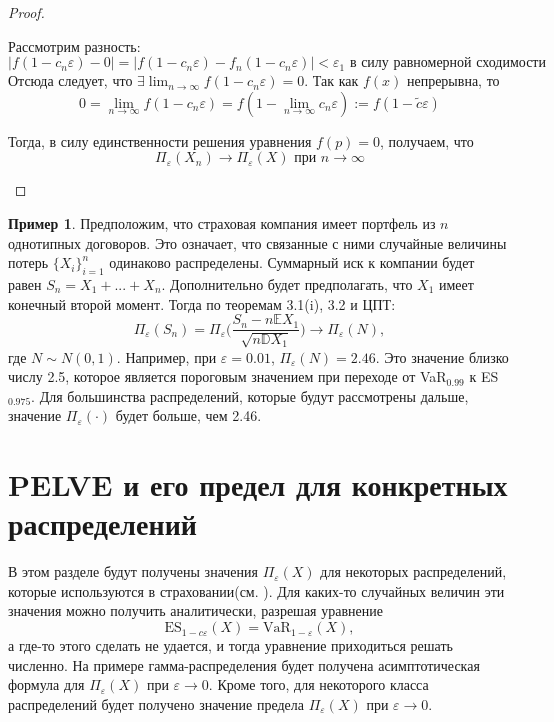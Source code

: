 \documentclass[12pt]{article}
\theoremstyle{plain}
\theoremstyle{definition}
\newtheorem{example}{Пример}[section]
\theoremstyle{remark}
\begin{document}
\begin{proof}
\begin{enumerate}
    Рассмотрим разность:
    \[
        |f(1-c_n\varepsilon)-0| = |f(1-c_n\varepsilon)-f_n(1-c_n\varepsilon)| < \varepsilon_1 \text{ в силу равномерной сходимости}
    \]
    Отсюда следует, что $\exists \lim_{n\to \infty} f(1-c_n\varepsilon)=0$. Так как $f(x)$ непрерывна, то 
    \[
        0 = \lim_{n\to \infty} f(1-c_n\varepsilon) = f(1- \lim_{n\to\infty}c_n\varepsilon):=f(1-\tilde{c}\varepsilon)
    \]

    Тогда, в силу единственности решения уравнения $f(p)=0$, получаем, что 
    \[
        \Pi_\varepsilon(X_n)\to\Pi_\varepsilon(X) \text{ при } n\to \infty
    \]
    \end{enumerate}
\end{proof}

\begin{example}
    Предположим, что страховая компания имеет портфель из $n$ однотипных договоров. Это означает, что связанные с ними случайные величины потерь $\{X_i\}_{i=1}^n$ одинаково распределены. Суммарный иск к компании будет равен $S_n=X_1+...+X_n$. Дополнительно будет предполагать, что $X_1$ имеет 
    конечный второй момент. Тогда по теоремам 3.1(i), 3.2 и ЦПТ:
    \[
    \Pi_\varepsilon(S_n)=\Pi_\varepsilon\bigg(\frac{S_n-n\mathbb{E}X_1}{\sqrt{n\mathbb{D}X_1}}\bigg)\to \Pi_\varepsilon(N),
    \]
    где $N \sim N(0,1).$ Например, при $\varepsilon = 0.01$, $\Pi_\varepsilon(N) = 2.46$. Это значение близко числу 2.5, которое является пороговым значением при переходе от VaR$_{0.99}$ к ES$_{0.975}$. Для большинства распределений, которые будут рассмотрены дальше, значение $\Pi_\varepsilon(\cdot)$ будет больше, чем 2.46. 
\end{example}

\section{PELVE и его предел для конкретных распределений}

В этом разделе будут получены значения $\Pi_\varepsilon(X)$ для некоторых распределений, которые используются в страховании(см. \cite{метка5}). Для каких-то случайных величин эти значения можно получить аналитически, разрешая уравнение 
\[
    \text{ES}_{1-c\varepsilon}(X)=\text{VaR}_{1-\varepsilon}(X),
\]
а где-то этого сделать не удается, и тогда уравнение приходиться решать численно. На примере гамма-распределения будет получена асимптотическая формула для $\Pi_\varepsilon(X)$ при $\varepsilon \to 0$. Кроме того, для некоторого класса распределений будет получено значение предела $\Pi_\varepsilon(X)$ при $\varepsilon \to 0$.
\end{document}
